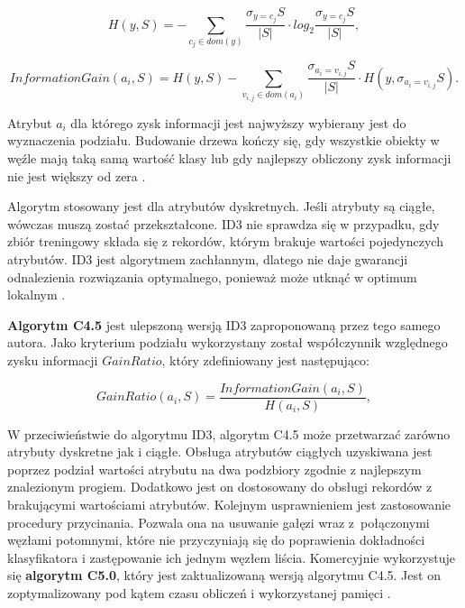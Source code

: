 \documentclass[12pt]{article}
\begin{document}
\begin{equation}
    H(y, S) = - \displaystyle\sum\limits_{c_j \in dom(y)}^{} \frac{\sigma_{y=c_j}S}{|S|} \cdot log_2 \frac{\sigma_{y=c_j}S}{|S|},
\end{equation}

\begin{equation}
    InformationGain(a_i, S) = H(y, S) - \displaystyle\sum\limits_{v_{i,j} \in dom(a_i)}^{} \displaystyle\frac{\sigma_{a_i=v_{i,j}}S}{|S|} \cdot H(y, \sigma_{a_i=v_{i,j}}S).
\end{equation}

Atrybut $a_i$ dla którego zysk informacji jest najwyższy wybierany jest do wyznaczenia podziału.
Budowanie drzewa kończy się, gdy wszystkie obiekty w węźle mają taką samą wartość
klasy lub gdy najlepszy obliczony zysk informacji nie jest większy od zera \cite{algorytmy-do-konstruowania-drzew-decyzyjnych}.

Algorytm stosowany jest dla atrybutów dyskretnych. Jeśli atrybuty są ciągłe, wówczas muszą
zostać przekształcone. ID3 nie sprawdza się w przypadku, gdy zbiór treningowy składa się z
rekordów, którym brakuje wartości pojedynczych atrybutów. ID3 jest algorytmem zachłannym,
dlatego nie daje gwarancji odnalezienia rozwiązania optymalnego, ponieważ może
utknąć w optimum lokalnym \cite{data-mining-with-decision-trees}.

\textbf{Algorytm C4.5} jest ulepszoną wersją ID3 zaproponowaną przez tego samego autora.
Jako kryterium podziału wykorzystany został współczynnik względnego zysku informacji $GainRatio$, który zdefiniowany jest następująco:

\begin{equation}
    GainRatio(a_i, S) = \displaystyle\frac{InformationGain(a_i, S)}{H(a_i, S)},
\end{equation}

\vspace{0.8cm}

W przeciwieństwie do algorytmu ID3, algorytm C4.5 może przetwarzać zarówno atrybuty dyskretne jak i ciągłe.
Obsługa atrybutów ciągłych uzyskiwana jest poprzez podział wartości atrybutu
na dwa podzbiory zgodnie z najlepszym znalezionym progiem.
Dodatkowo jest on dostosowany do obsługi rekordów z brakującymi wartościami atrybutów. Kolejnym usprawnieniem
jest zastosowanie procedury przycinania. Pozwala ona na usuwanie gałęzi wraz z~połączonymi węzłami potomnymi, które
nie przyczyniają się do poprawienia dokładności klasyfikatora i zastępowanie ich jednym węzłem liścia.
Komercyjnie wykorzystuje się \textbf{algorytm C5.0}, który jest zaktualizowaną wersją algorytmu C4.5.
Jest on zoptymalizowany pod kątem czasu obliczeń i wykorzystanej pamięci \cite{data-mining-with-decision-trees}.
\end{document}
